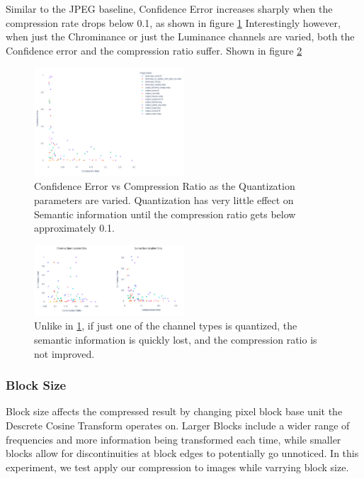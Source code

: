 Similar to the JPEG baseline, Confidence Error increases sharply when the compression rate drops below 0.1, as shown in figure \ref{fig:Confidence vs Quantization}
Interestingly however, when just the Chrominance or just the Luminance channels are varied, both the Confidence error and the compression ratio suffer. Shown in figure \ref{fig:just chroma or luma downsampling}
\begin{figure}
    \label{fig:Confidence vs Quantization}
    \includegraphics[width=0.5\textwidth]{assets/Quantization Sweep No Title Chrominance and Luminance.png}
    \caption{Confidence Error vs Compression Ratio as the Quantization parameters are varied. Quantization has very little effect on Semantic information until the compression ratio gets below approximately 0.1.}
    \label{fig:Confidence vs Quantization}
\end{figure}
\begin{figure}
    \includegraphics[width=0.5\textwidth]{assets/Chroma and Luma downsampling combined.png}
    \caption{Unlike in \ref{fig:Confidence vs Quantization}, if just one of the channel types is quantized, the semantic information is quickly lost, and the compression ratio is not improved.}
    \label{fig:just chroma or luma downsampling}
\end{figure}

\subsubsection{Block Size}

Block size affects the compressed result by changing pixel block base unit the Descrete Cosine Transform operates on.
Larger Blocks include a wider range of frequencies and more information being transformed each time, while smaller blocks allow for discontinuities at block edges to potentially go unnoticed.
In this experiment, we test apply our compression to images while varrying block size.

